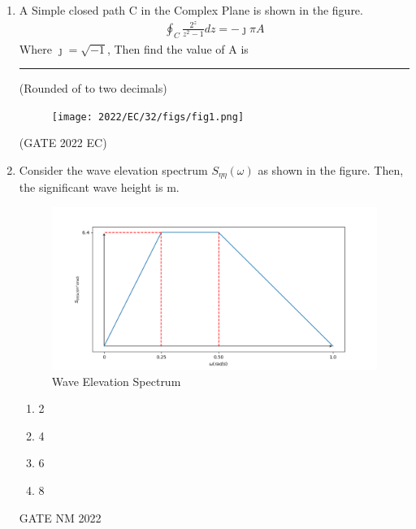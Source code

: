 \begin{enumerate}[label=\thechapter.\arabic*,ref=\thechapter.\theenumi]
\solution

\item  A Simple closed path C in the Complex Plane is shown in the figure.
 \begin{align*}
        \oint_C \frac{2^z}{z^2-1}dz=-\jmath \pi A
 \end{align*}
 Where $\jmath=\sqrt{-1}$, Then find the value of A is \rule{1cm}{0.15mm}(Rounded of to two decimals)
\begin{figure}[h!]
    \centering
    \texttt{[image: 2022/EC/32/figs/fig1.png]}
\end{figure}
\hfill{(GATE 2022 EC)}\\
\solution 

\pagebreak
\item Consider the wave elevation spectrum $S_{\eta \eta}(\omega)$ as shown in the figure. Then, the significant wave height is \underline{\hspace{3cm}} m.
\begin{figure}[H]
    \centering
    \includegraphics[width=\columnwidth]{2022/NM/40/figs/qfig.png}
    \caption{Wave Elevation Spectrum}
    \label{fig: GATE22NM40.1}
\end{figure}

\begin{enumerate}[label=(\Alph*)]
\item 2
\item 4
\item 6
\item 8
\end{enumerate}
\hfill{GATE NM 2022}
\solution

\pagebreak
\end{enumerate}
